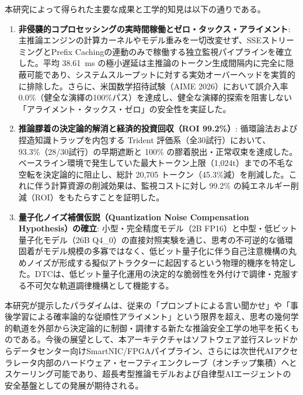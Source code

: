 \documentclass[11pt,a4paper]{article}
\begin{document}
本研究によって得られた主要な成果と工学的知見は以下の通りである。
\begin{enumerate}
    \item \textbf{非侵襲的コプロセッシングの実時間稼働とゼロ・タックス・アライメント}: 主推論エンジンの計算カーネルやモデル重みを一切改変せず、SSEストリーミングとPrefix Cachingの連動のみで稼働する独立監視パイプラインを確立した。平均 38.61~ms の極小遅延は主推論のトークン生成間隔内に完全に隠蔽可能であり、システムスループットに対する実効オーバーヘッドを実質的に排除した。さらに、米国数学招待試験（AIME 2026）において誤介入率 0.0\%（健全な演繹の100\%パス）を達成し、健全な演繹的探索を阻害しない「アライメント・タックス・ゼロ」の安全性を実証した。
    \item \textbf{推論膠着の決定論的解消と経済的投資回収（ROI 99.2\%）}: 循環論法および捏造知識トラップを内包する Trident 評価系（全30試行）において、93.3\%（28/30試行）の早期遮断と 100\% の膠着脱出・正常収束を達成した。ベースライン環境で発生していた最大トークン上限（1,024t）までの不毛な空転を決定論的に阻止し、総計 20,705 トークン（45.3\%減）を削減した。これに伴う計算資源の削減効果は、監視コストに対し 99.2\% の純エネルギー削減（ROI）をもたらすことを証明した。
    \item \textbf{量子化ノイズ補償仮説（Quantization Noise Compensation Hypothesis）の確立}: 小型・完全精度モデル（2B FP16）と中型・低ビット量子化モデル（26B Q4\_0）の直接対照実験を通じ、思考の不可逆的な循環固着がモデル規模の多寡ではなく、低ビット量子化に伴う自己注意機構の丸めノイズが形成する擬似アトラクターに起因するという物理的機序を特定した。DTCは、低ビット量子化運用の決定的な脆弱性を外付けで調律・克服する不可欠な軌道調律機構として機能する。
\end{enumerate}

本研究が提示したパラダイムは、従来の「プロンプトによる言い聞かせ」や「事後学習による確率論的な従順性アライメント」という限界を超え、思考の幾何学的軌道を外部から決定論的に制御・調律する新たな推論安全工学の地平を拓くものである。今後の展望として、本アーキテクチャはソフトウェア並行スレッドからデータセンター向けSmartNIC/FPGAパイプライン、さらには次世代AIアクセラレータ内部のハードウェア・セーフティエンクレーブ（オンチップ集積）へとスケーリング可能であり、超長考型推論モデルおよび自律型AIエージェントの安全基盤としての発展が期待される。
\end{document}
